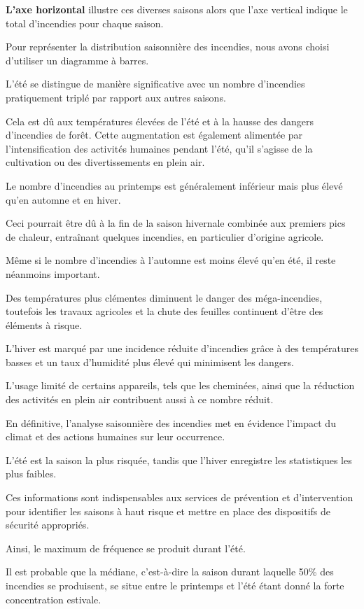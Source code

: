\documentclass[
]{article}
\begin{document}
\textbf{L'axe horizontal} illustre ces diverses saisons alors que l'axe
vertical indique le total d'incendies pour chaque saison.

Pour représenter la distribution saisonnière des incendies, nous avons
choisi d'utiliser un diagramme à barres.

L'été se distingue de manière significative avec un nombre d'incendies
pratiquement triplé par rapport aux autres saisons.

Cela est dû aux températures élevées de l'été et à la hausse des dangers
d'incendies de forêt. Cette augmentation est également alimentée par
l'intensification des activités humaines pendant l'été, qu'il s'agisse
de la cultivation ou des divertissements en plein air.

Le nombre d'incendies au printemps est généralement inférieur mais plus
élevé qu'en automne et en hiver.

Ceci pourrait être dû à la fin de la saison hivernale combinée aux
premiers pics de chaleur, entraînant quelques incendies, en particulier
d'origine agricole.

Même si le nombre d'incendies à l'automne est moins élevé qu'en été, il
reste néanmoins important.

Des températures plus clémentes diminuent le danger des méga-incendies,
toutefois les travaux agricoles et la chute des feuilles continuent
d'être des éléments à risque.

L'hiver est marqué par une incidence réduite d'incendies grâce à des
températures basses et un taux d'humidité plus élevé qui minimisent les
dangers.

L'usage limité de certains appareils, tels que les cheminées, ainsi que
la réduction des activités en plein air contribuent aussi à ce nombre
réduit.

En définitive, l'analyse saisonnière des incendies met en évidence
l'impact du climat et des actions humaines sur leur occurrence.

L'été est la saison la plus risquée, tandis que l'hiver enregistre les
statistiques les plus faibles.

Ces informations sont indispensables aux services de prévention et
d'intervention pour identifier les saisons à haut risque et mettre en
place des dispositifs de sécurité appropriés.

Ainsi, le maximum de fréquence se produit durant l'été.

Il est probable que la médiane, c'est-à-dire la saison durant laquelle
50\% des incendies se produisent, se situe entre le printemps et l'été
étant donné la forte concentration estivale.
\end{document}
